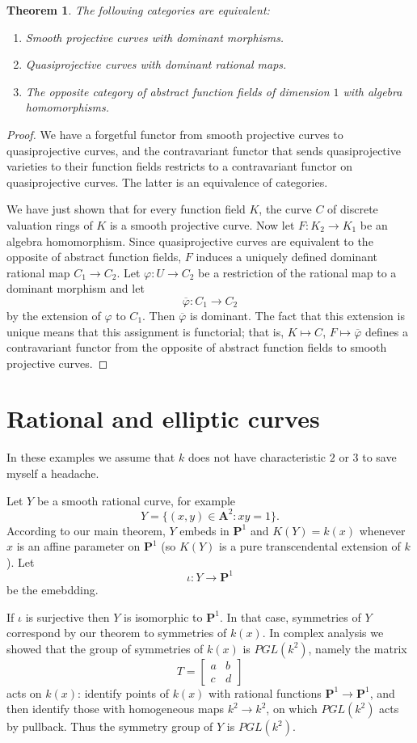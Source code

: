 \documentclass[reqno,12pt,letterpaper]{amsart}
\newcommand{\PP}{\mathbf P}
\newcommand{\Aff}{\mathbf A}
\newtheorem{theorem}{Theorem}[section]
\theoremstyle{definition}
\begin{document}
\begin{theorem}
The following categories are equivalent:
\begin{enumerate}
\item Smooth projective curves with dominant morphisms.
\item Quasiprojective curves with dominant rational maps.
\item The opposite category of abstract function fields of dimension $1$ with algebra homomorphisms.
\end{enumerate}
\end{theorem}
\begin{proof}
We have a forgetful functor from smooth projective curves to quasiprojective curves, and the contravariant functor that sends quasiprojective varieties to their function fields restricts to a contravariant functor on quasiprojective curves.
The latter is an equivalence of categories.

We have just shown that for every function field $K$, the curve $C$ of discrete valuation rings of $K$ is a smooth projective curve.
Now let $F: K_2 \to K_1$ be an algebra homomorphism.
Since quasiprojective curves are equivalent to the opposite of abstract function fields, $F$ induces a uniquely defined dominant rational map $C_1 \to C_2$.
Let $\varphi: U \to C_2$ be a restriction of the rational map to a dominant morphism and let
$$\overline \varphi: C_1 \to C_2$$
by the extension of $\varphi$ to $C_1$.
Then $\overline \varphi$ is dominant. The fact that this extension is unique means that this assignment is functorial; that is, $K \mapsto C$, $F \mapsto \overline \varphi$ defines a contravariant functor from the opposite of abstract function fields to smooth projective curves.
\end{proof}

\section{Rational and elliptic curves}
In these examples we assume that $k$ does not have characteristic $2$ or $3$ to save myself a headache.

Let $Y$ be a smooth rational curve, for example
$$Y = \{(x, y) \in \Aff^2: xy = 1\}.$$
According to our main theorem, $Y$ embeds in $\PP^1$ and $K(Y) = k(x)$ whenever $x$ is an affine parameter on $\PP^1$ (so $K(Y)$ is a pure transcendental extension of $k$).
Let
$$\iota: Y \to \PP^1$$
be the emebdding.

If $\iota$ is surjective then $Y$ is isomorphic to $\PP^1$.
In that case, symmetries of $Y$ correspond by our theorem to symmetries of $k(x)$.
In complex analysis we showed that the group of symmetries of $k(x)$ is $PGL(k^2)$, namely the matrix
$$T = \begin{bmatrix}a & b\\c & d\end{bmatrix}$$
acts on $k(x)$: identify points of $k(x)$ with rational functions $\PP^1 \to \PP^1$, and then identify those with homogeneous maps $k^2 \to k^2$, on which $PGL(k^2)$ acts by pullback.
Thus the symmetry group of $Y$ is $PGL(k^2)$.
\end{document}
